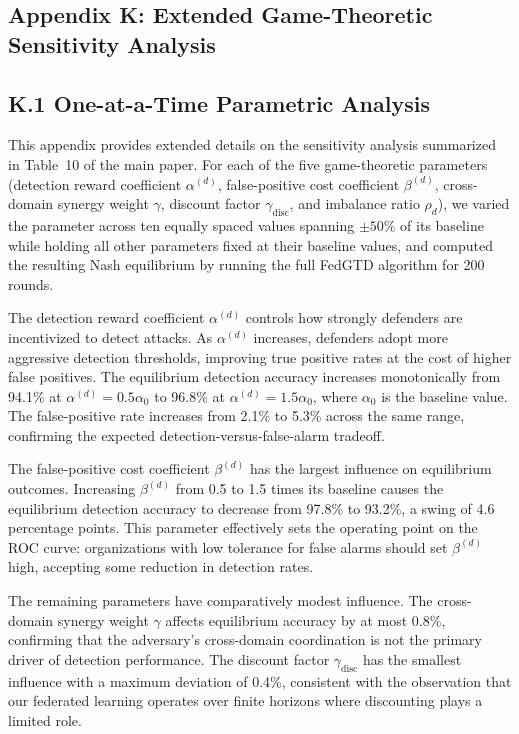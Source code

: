 \documentclass[12pt,a4paper]{article}
\newcommand{\rev}[1]{\textcolor{revcolor}{#1}}
\theoremstyle{definition}
\begin{document}
\rev{
\section{Appendix K: Extended Game-Theoretic Sensitivity Analysis}
\label{sec:extended_sensitivity}

\subsection{K.1 One-at-a-Time Parametric Analysis}

This appendix provides extended details on the sensitivity analysis summarized in Table~10 of the main paper. For each of the five game-theoretic parameters (detection reward coefficient $\alpha^{(d)}$, false-positive cost coefficient $\beta^{(d)}$, cross-domain synergy weight $\gamma$, discount factor $\gamma_{\text{disc}}$, and imbalance ratio $\rho_d$), we varied the parameter across ten equally spaced values spanning $\pm 50\%$ of its baseline while holding all other parameters fixed at their baseline values, and computed the resulting Nash equilibrium by running the full FedGTD algorithm for 200 rounds.

The detection reward coefficient $\alpha^{(d)}$ controls how strongly defenders are incentivized to detect attacks. As $\alpha^{(d)}$ increases, defenders adopt more aggressive detection thresholds, improving true positive rates at the cost of higher false positives. The equilibrium detection accuracy increases monotonically from 94.1\% at $\alpha^{(d)} = 0.5 \alpha_0$ to 96.8\% at $\alpha^{(d)} = 1.5 \alpha_0$, where $\alpha_0$ is the baseline value. The false-positive rate increases from 2.1\% to 5.3\% across the same range, confirming the expected detection-versus-false-alarm tradeoff.

The false-positive cost coefficient $\beta^{(d)}$ has the largest influence on equilibrium outcomes. Increasing $\beta^{(d)}$ from 0.5 to 1.5 times its baseline causes the equilibrium detection accuracy to decrease from 97.8\% to 93.2\%, a swing of 4.6 percentage points. This parameter effectively sets the operating point on the ROC curve: organizations with low tolerance for false alarms should set $\beta^{(d)}$ high, accepting some reduction in detection rates.

The remaining parameters have comparatively modest influence. The cross-domain synergy weight $\gamma$ affects equilibrium accuracy by at most 0.8\%, confirming that the adversary's cross-domain coordination is not the primary driver of detection performance. The discount factor $\gamma_{\text{disc}}$ has the smallest influence with a maximum deviation of 0.4\%, consistent with the observation that our federated learning operates over finite horizons where discounting plays a limited role.

}
\end{document}
